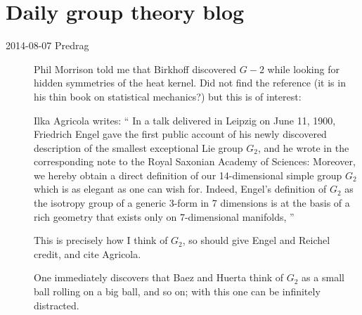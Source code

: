 \section{Daily group theory blog}
\label{s-groupTheBlog}



\begin{description}
\item[2014-08-07  Predrag]
Phil Morrison told me that Birkhoff discovered $G-2$ while looking for
hidden symmetries of the heat kernel. Did not find the reference (it is
in his thin book on statistical mechanics?) but this is of interest:

Ilka Agricola writes:
``
In a talk delivered in Leipzig on June 11, 1900, Friedrich
Engel gave the first public account of his newly discovered
description of the smallest exceptional Lie group $G_2$, and he wrote in
the corresponding note to the Royal Saxonian Academy of Sciences:
Moreover, we hereby obtain a direct definition of our 14-dimensional
simple group $G_2$ which is as elegant as one can wish for. Indeed,
Engel's definition of $G_2$ as the isotropy group of a generic 3-form in
7 dimensions is at the basis of a rich geometry that exists only on
7-dimensional manifolds,
''

This is precisely how I think of $G_2$, so should give Engel and
Reichel credit, and
cite Agricola.

One immediately discovers that Baez and Huerta think of
$G_2$ as a small ball rolling on a big ball, and so on; with this one can
be infinitely distracted.


\end{description}
\renewcommand{\ssp}{a}
